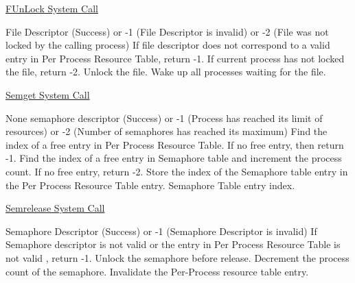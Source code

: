
\begin{algorithm}
\caption{\href{http://exposnitc.github.io/os_design-files/synchronization_algos.html#funlock}{FUnLock System Call}}
\begin{algorithmic}
\REQUIRE File Descriptor
 (Success) or -1 (File Descriptor is invalid) or -2 (File was not locked by the calling process)
\STATE If file descriptor does not correspond to a valid entry in Per Process Resource Table, return -1.
    \STATE If current process has not locked the file, return -2.
    \STATE Unlock the file.
    \STATE Wake up all processes waiting for the file.
\ENDIF
{}
\end{algorithmic}
\end{algorithm}



\begin{algorithm}
\caption{\href{http://exposnitc.github.io/os_design-files/semaphore_algos.html#semget}{Semget System Call}}
\begin{algorithmic}
\REQUIRE None
\ENSURE semaphore descriptor (Success) or -1 (Process has reached its limit of resources) or -2 (Number of semaphores has reached its maximum)
\STATE Find the index of a free entry in Per Process Resource Table. If no free entry, then return -1.
\STATE Find the index of a free entry in Semaphore table and increment the process count. If no free entry, return -2.
\STATE Store the index of the Semaphore table entry in the Per Process Resource Table entry.  
\RETURN Semaphore Table entry index.  
\end{algorithmic}
\end{algorithm}


\begin{algorithm}
\caption{\href{http://exposnitc.github.io/os_design-files/semaphore_algos.html#semrelease}{Semrelease System Call}}
\begin{algorithmic}
\REQUIRE Semaphore Descriptor
 (Success) or -1 (Semaphore Descriptor is invalid)
\STATE If Semaphore descriptor is not valid or the entry in Per Process Resource Table is not valid , return -1.
    \STATE Unlock the semaphore before release.
\ENDIF
\STATE Decrement the process count of the semaphore.
\STATE Invalidate the Per-Process resource table entry.  
\end{algorithmic}
\end{algorithm}

